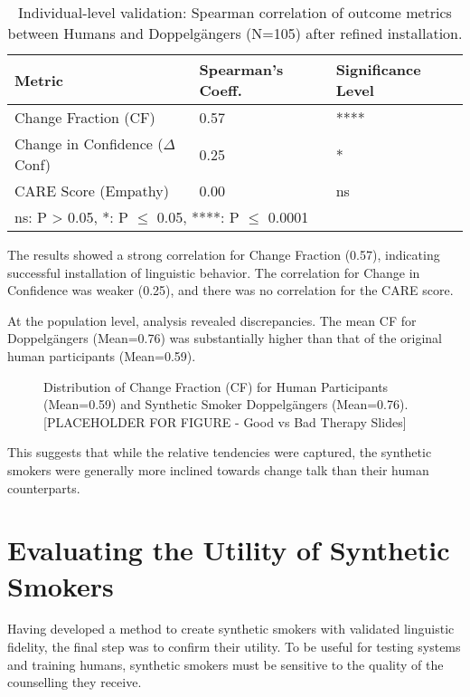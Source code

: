 \begin{table}[h!]
\centering
\caption{Individual-level validation: Spearman correlation of outcome metrics between Humans and Doppelgängers (N=105) after refined installation.}
\label{tab:doppelganger-correlations}
\begin{tabular}{@{}lll@{}}
\toprule
\textbf{Metric} & \textbf{Spearman's Coeff.} & \textbf{Significance Level} \\ \midrule
Change Fraction (CF) & 0.57 & **** \\
Change in Confidence ($\Delta$Conf) & 0.25 & * \\
CARE Score (Empathy) & 0.00 & ns \\ \bottomrule
\multicolumn{3}{l}{\footnotesize{ns: P > 0.05, *: P $\le$ 0.05, ****: P $\le$ 0.0001}}
\end{tabular}
\end{table}

The results showed a strong correlation for Change Fraction (0.57), indicating successful installation of linguistic behavior. The correlation for Change in Confidence was weaker (0.25), and there was no correlation for the CARE score.

At the population level, analysis revealed discrepancies. The mean CF for Doppelgängers (Mean=0.76) was substantially higher than that of the original human participants (Mean=0.59).

\begin{figure}[ht]
    \centering
    \caption{Distribution of Change Fraction (CF) for Human Participants (Mean=0.59) and Synthetic Smoker Doppelgängers (Mean=0.76). [PLACEHOLDER FOR FIGURE - Good vs Bad Therapy Slides]}
    \label{fig:cf-distribution}
\end{figure}

This suggests that while the relative tendencies were captured, the synthetic smokers were generally more inclined towards change talk than their human counterparts.

\section{Evaluating the Utility of Synthetic Smokers}
\label{sec:synthetic-smoker-utility}

Having developed a method to create synthetic smokers with validated linguistic fidelity, the final step was to confirm their utility. To be useful for testing systems and training humans, synthetic smokers must be sensitive to the quality of the counselling they receive.

